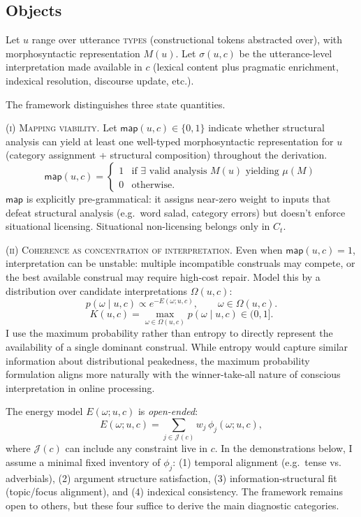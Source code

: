 \documentclass[12pt,letterpaper]{article}
\newcommand{\term}[1]{\textsc{#1}}
\begin{document}
\subsection{Objects}
\label{sec:objects}

Let $u$ range over utterance \term{types} (constructional tokens abstracted over),
with morphosyntactic representation $M(u)$.  Let $\sigma(u,c)$ be the
utterance-level interpretation made available in $c$ (lexical content plus
pragmatic enrichment, indexical resolution, discourse update, etc.).

The framework distinguishes three state quantities.

\textsc{(i) Mapping viability.}
Let $\mathsf{map}(u,c)\in\{0,1\}$ indicate whether structural analysis can yield at least one well-typed morphosyntactic representation for $u$ (category assignment + structural composition) throughout the derivation.
\begin{equation*}
\mathsf{map}(u,c)=
\begin{cases}
1 & \text{if }\exists \text{ valid analysis } M(u) \text{ yielding } \mu(M)\\
0 & \text{otherwise.}
\end{cases}
\end{equation*}
$\mathsf{map}$ is explicitly pre-grammatical: it assigns near-zero weight to inputs that defeat structural analysis (e.g.\ word salad, category errors) but doesn't enforce situational licensing. Situational non-licensing belongs only in $C_t$.

\textsc{(ii) Coherence as concentration of interpretation.}
Even when $\mathsf{map}(u,c)=1$, interpretation can be unstable: multiple
incompatible construals may compete, or the best available construal may require
high-cost repair. Model this by a distribution over candidate interpretations
$\Omega(u,c)$:
$$
p(\omega\mid u,c)\propto e^{-E(\omega;u,c)},\qquad \omega\in\Omega(u,c).
$$
$$
K(u,c)=\max_{\omega\in\Omega(u,c)} p(\omega\mid u,c)\in(0,1].
$$
I use the maximum probability rather than entropy to directly represent the availability of a single dominant construal. While entropy would capture similar information about distributional peakedness, the maximum probability formulation aligns more naturally with the winner-take-all nature of conscious interpretation in online processing.

The energy model $E(\omega;u,c)$ is \emph{open-ended}:
\begin{equation*}
E(\omega;u,c)=\sum_{j\in\mathcal{J}(c)} w_j\,\phi_j(\omega;u,c),
\end{equation*}
where $\mathcal{J}(c)$ can include any constraint live in $c$. In the demonstrations below, I assume a minimal fixed inventory of $\phi_j$: (1) temporal alignment (e.g.\ tense vs. adverbials), (2) argument structure satisfaction, (3) information-structural fit (topic/focus alignment), and (4) indexical consistency. The framework remains open to others, but these four suffice to derive the main diagnostic categories.
\end{document}
